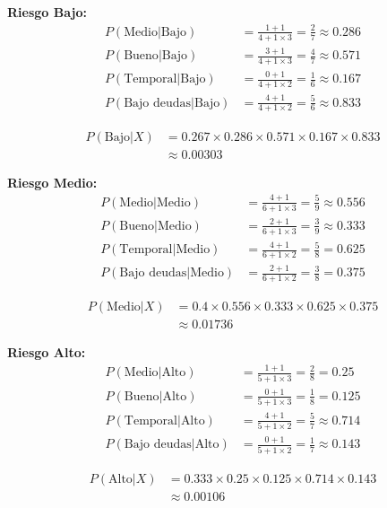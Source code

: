 \documentclass[12pt]{article}
\begin{document}
\textbf{Riesgo Bajo:}
\begin{align*}
P(\text{Medio}|\text{Bajo}) &= \frac{1 + 1}{4 + 1 \times 3} = \frac{2}{7} \approx 0.286 \\
P(\text{Bueno}|\text{Bajo}) &= \frac{3 + 1}{4 + 1 \times 3} = \frac{4}{7} \approx 0.571 \\
P(\text{Temporal}|\text{Bajo}) &= \frac{0 + 1}{4 + 1 \times 2} = \frac{1}{6} \approx 0.167 \\
P(\text{Bajo deudas}|\text{Bajo}) &= \frac{4 + 1}{4 + 1 \times 2} = \frac{5}{6} \approx 0.833
\end{align*}

\begin{align*}
P(\text{Bajo}|X) &= 0.267 \times 0.286 \times 0.571 \times 0.167 \times 0.833 \\
&\approx 0.00303
\end{align*}

\textbf{Riesgo Medio:}
\begin{align*}
P(\text{Medio}|\text{Medio}) &= \frac{4 + 1}{6 + 1 \times 3} = \frac{5}{9} \approx 0.556 \\
P(\text{Bueno}|\text{Medio}) &= \frac{2 + 1}{6 + 1 \times 3} = \frac{3}{9} \approx 0.333 \\
P(\text{Temporal}|\text{Medio}) &= \frac{4 + 1}{6 + 1 \times 2} = \frac{5}{8} = 0.625 \\
P(\text{Bajo deudas}|\text{Medio}) &= \frac{2 + 1}{6 + 1 \times 2} = \frac{3}{8} = 0.375
\end{align*}

\begin{align*}
P(\text{Medio}|X) &= 0.4 \times 0.556 \times 0.333 \times 0.625 \times 0.375 \\
&\approx 0.01736
\end{align*}

\textbf{Riesgo Alto:}
\begin{align*}
P(\text{Medio}|\text{Alto}) &= \frac{1 + 1}{5 + 1 \times 3} = \frac{2}{8} = 0.25 \\
P(\text{Bueno}|\text{Alto}) &= \frac{0 + 1}{5 + 1 \times 3} = \frac{1}{8} = 0.125 \\
P(\text{Temporal}|\text{Alto}) &= \frac{4 + 1}{5 + 1 \times 2} = \frac{5}{7} \approx 0.714 \\
P(\text{Bajo deudas}|\text{Alto}) &= \frac{0 + 1}{5 + 1 \times 2} = \frac{1}{7} \approx 0.143
\end{align*}

\begin{align*}
P(\text{Alto}|X) &= 0.333 \times 0.25 \times 0.125 \times 0.714 \times 0.143 \\
&\approx 0.00106
\end{align*}
\end{document}
